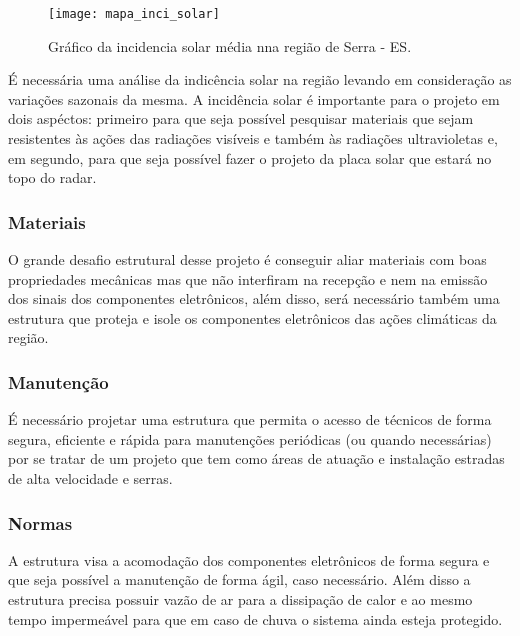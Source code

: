 \begin{figure}[!ht]
	\texttt{[image: mapa\_inci\_solar]}
	\centering
	\caption{Gráfico da incidencia solar média nna região de Serra - ES.}
\end{figure}

É necessária uma análise da indicência solar na região levando em consideração as variações sazonais da mesma. A incidência solar é importante para o projeto em dois aspéctos: primeiro para que seja possível pesquisar materiais que sejam resistentes às ações das radiações  visíveis e também às radiações ultravioletas e, em segundo, para que seja possível fazer o projeto da placa solar que estará no topo do radar.

\subsubsection{Materiais}

O grande desafio estrutural desse projeto é conseguir aliar materiais com boas propriedades mecânicas mas que não interfiram na recepção e nem na emissão dos sinais dos componentes eletrônicos, além disso, será necessário também uma estrutura que proteja e isole os componentes eletrônicos das ações climáticas da região. 

\subsubsection{Manutenção}

É necessário projetar uma estrutura que permita o acesso de técnicos de forma segura, eficiente e rápida para manutenções periódicas (ou quando necessárias) por se tratar de um projeto que tem como áreas de atuação e instalação estradas de alta velocidade e serras.

\subsubsection{Normas}

A estrutura visa a acomodação dos componentes eletrônicos de forma segura e que
seja possível a manutenção de forma ágil, caso necessário. Além disso a estrutura
precisa possuir vazão de ar para a dissipação de calor e ao mesmo tempo
impermeável para que em caso de chuva o sistema ainda esteja protegido.

